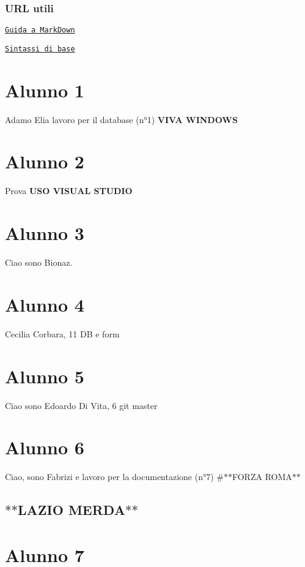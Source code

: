 \subsubsection*{U\+RL utili}


\begin{DoxyItemize}
\item \href{https://guides.github.com/features/mastering-markdown/}{\tt Guida a Mark\+Down}
\item \href{https://help.github.com/articles/basic-writing-and-formatting-syntax/}{\tt Sintassi di base}
\end{DoxyItemize}

\section*{Alunno 1}

Adamo Elia lavoro per il database (n°1) {\bfseries V\+I\+VA W\+I\+N\+D\+O\+WS} \section*{Alunno 2}

Prova {\bfseries U\+SO V\+I\+S\+U\+AL S\+T\+U\+D\+IO} \section*{Alunno 3}

Ciao sono Bionaz. \section*{Alunno 4}

Cecilia Corbara, 11 DB e form \section*{Alunno 5}

Ciao sono Edoardo Di Vita, 6 git master \section*{Alunno 6}

Ciao, sono Fabrizi e lavoro per la documentazione (n°7) \#$\ast$$\ast$\+F\+O\+R\+ZA R\+O\+M\+A$\ast$$\ast$ \subsection*{$\ast$$\ast$\+L\+A\+Z\+IO M\+E\+R\+D\+A$\ast$$\ast$}

\section*{Alunno 7}

